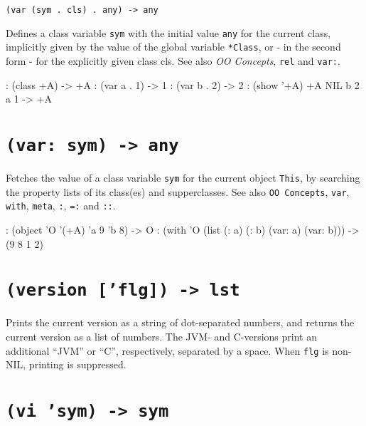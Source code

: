 \texttt{(var (sym . cls) . any) -> any}

Defines a class variable \texttt{sym} with the initial value \texttt{any} for the
current class, implicitly given by the value of the global variable
\texttt{*Class}, or - in the second form - for the explicitly given class cls.
See also \emph{OO Concepts}, \texttt{rel} and \texttt{var:}.


\begin{wideverbatim}
: (class +A)
-> +A
: (var a . 1)
-> 1
: (var b . 2)
-> 2
: (show '+A)
+A NIL
   b 2
   a 1
-> +A
\end{wideverbatim}

 
\section*{\texttt{(var: sym) -> any}}
\label{sec:func-ref-V-(var: sym) -> any}


Fetches the value of a class variable \texttt{sym} for the current
object \texttt{This}, by searching the property lists of its class(es)
and supperclasses. See also \texttt{OO Concepts}, \texttt{var},
\texttt{with}, \texttt{meta}, \texttt{:}, \texttt{=:} and \texttt{::}.


\begin{wideverbatim}
: (object 'O '(+A) 'a 9 'b 8)
-> O
: (with 'O (list (: a) (: b) (var: a) (var: b)))
-> (9 8 1 2)
\end{wideverbatim}

 
\section*{\texttt{(version ['flg]) -> lst}}
\label{sec:func-ref-V-(version ['flg]) -> lst}


Prints the current version as a string of dot-separated numbers, and
returns the current version as a list of numbers. The JVM- and
C-versions print an additional ``JVM'' or ``C'', respectively, separated by
a space. When \texttt{flg} is non-NIL, printing is suppressed.



 
\section*{\texttt{(vi 'sym) -> sym}}
\label{sec:func-ref-V-(vi 'sym) -> sym}


